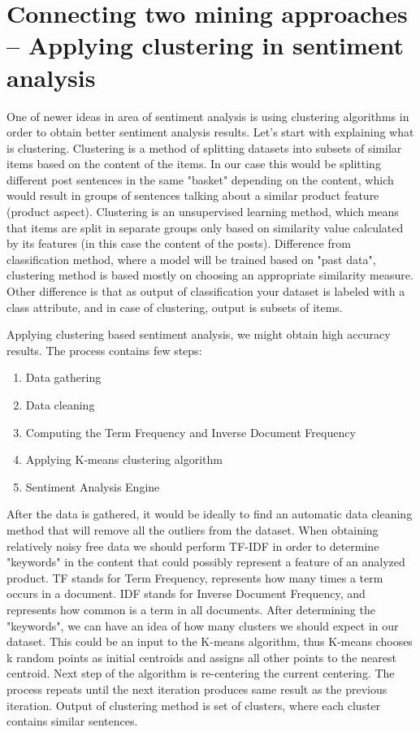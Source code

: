 \section{Connecting two mining approaches – Applying clustering in sentiment analysis}

One of newer ideas in area of sentiment analysis is using clustering algorithms in order to obtain better sentiment analysis results. Let's start with explaining what is clustering. Clustering is a method of splitting datasets into subsets of similar items based on the content of the items. In our case this would be splitting different post sentences in the same "basket" depending on the content, which would result in groups of sentences talking about a similar product feature (product aspect). 
Clustering is an unsupervised learning method, which means that items are split in separate groups only based on similarity value calculated by its features (in this case the content of the posts). Difference from classification method, where a model will be trained based on "past data", clustering method is based mostly on choosing an appropriate similarity measure. Other difference is that as output of classification your dataset is labeled with a class attribute, and in case of clustering, output is subsets of items. 

Applying clustering based sentiment analysis, we might obtain high accuracy results. The process contains few steps: 
\begin{enumerate}
	\item Data gathering
	\item Data cleaning
	\item Computing the Term Frequency and Inverse Document Frequency
	\item Applying K-means clustering algorithm
	\item Sentiment Analysis Engine
\end{enumerate}

After the data is gathered, it would be ideally to find an automatic data cleaning method that will remove all the outliers from the dataset. When obtaining relatively noisy free data we should perform TF-IDF in order to determine "keywords" in the content that could possibly represent a feature of an analyzed product. TF stands for Term Frequency, represents how many times a term occurs in a document. IDF stands for Inverse Document Frequency, and represents how common is a term in all documents. 
After determining the "keywords", we can have an idea of how many clusters we should expect in our dataset. This could be an input to the K-means algorithm, thus K-means chooses k random points as initial centroids and assigns all other points to the nearest centroid. Next step of the algorithm is re-centering the current centering. The process repeats until the next iteration produces same result as the previous iteration. Output of clustering method is set of clusters, where each cluster contains similar sentences. 

